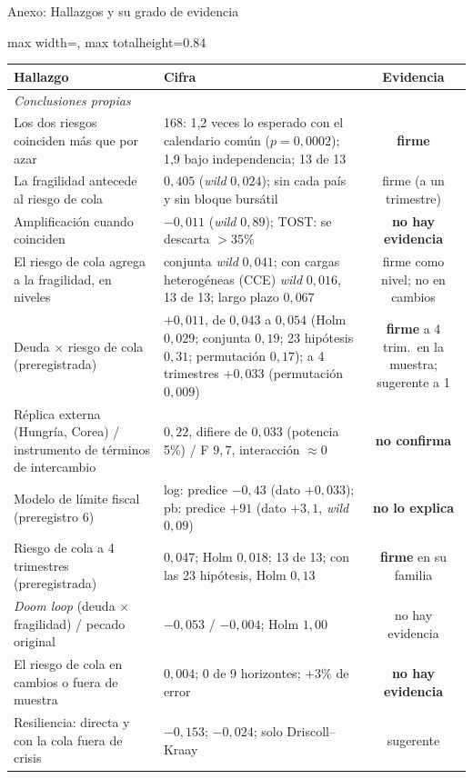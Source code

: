 \documentclass[aspectratio=169]{beamer}
\begin{document}
\begin{frame}{Anexo: Hallazgos y su grado de evidencia}
\centering
\footnotesize
\begin{adjustbox}{max width=\textwidth, max totalheight=0.84\textheight}
\begin{tabular}{llc}
\toprule
Hallazgo & Cifra & Evidencia \\
\midrule
\multicolumn{3}{l}{\textit{Conclusiones propias}} \\
Los dos riesgos coinciden más que por azar & 168: 1,2 veces lo esperado con el calendario común ($p=0{,}0002$); 1,9 bajo independencia; 13 de 13 & \textbf{firme} \\
La fragilidad antecede al riesgo de cola & $0{,}405$ (\textit{wild} $0{,}024$); sin cada país y sin bloque bursátil & firme (a un trimestre) \\
Amplificación cuando coinciden & $-0{,}011$ (\textit{wild} $0{,}89$); TOST: se descarta $>35\%$ & \textbf{no hay evidencia} \\
El riesgo de cola agrega a la fragilidad, en niveles & conjunta \textit{wild} $0{,}041$; con cargas heterogéneas (CCE) \textit{wild} $0{,}016$, 13 de 13; largo plazo $0{,}067$ & firme como nivel; no en cambios \\
Deuda $\times$ riesgo de cola (preregistrada) & $+0{,}011$, de $0{,}043$ a $0{,}054$ (Holm $0{,}029$; conjunta $0{,}19$; 23 hipótesis $0{,}31$; permutación $0{,}17$); a 4 trimestres $+0{,}033$ (permutación $0{,}009$) & \textbf{firme} a 4 trim.\ en la muestra; sugerente a 1 \\
Réplica externa (Hungría, Corea) / instrumento de términos de intercambio & $0{,}22$, difiere de $0{,}033$ (potencia 5\%) / F $9{,}7$, interacción $\approx0$ & \textbf{no confirma} \\
Modelo de límite fiscal (preregistro 6) & log: predice $-0{,}43$ (dato $+0{,}033$); pb: predice $+91$ (dato $+3{,}1$, \textit{wild} $0{,}09$) & \textbf{no lo explica} \\
Riesgo de cola a 4 trimestres (preregistrada) & $0{,}047$; Holm $0{,}018$; 13 de 13; con las 23 hipótesis, Holm $0{,}13$ & \textbf{firme} en su familia \\
\textit{Doom loop} (deuda $\times$ fragilidad) / pecado original & $-0{,}053$ / $-0{,}004$; Holm $1{,}00$ & no hay evidencia \\
El riesgo de cola en cambios o fuera de muestra & $0{,}004$; 0 de 9 horizontes; $+3\%$ de error & \textbf{no hay evidencia} \\
Resiliencia: directa y con la cola fuera de crisis & $-0{,}153$; $-0{,}024$; solo Driscoll--Kraay & sugerente \\

\end{tabular}
\end{adjustbox}
\end{frame}
\end{document}
